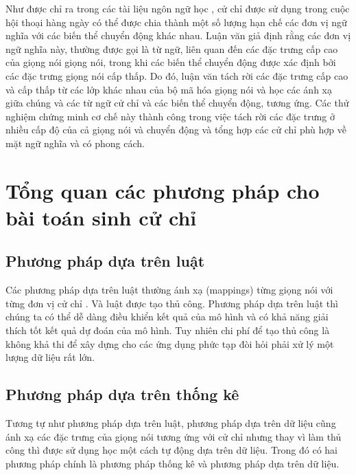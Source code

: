 Như được chỉ ra trong các tài liệu ngôn ngữ học \cite{kipp2005gesture} \cite{neff2008gesture} \cite{webb1997linguistic},
cử chỉ được sử dụng trong cuộc hội thoại hàng ngày có thể được chia thành một số lượng hạn chế các đơn vị ngữ nghĩa với các biến thể chuyển động khác nhau. Luận văn giả định rằng các đơn vị ngữ nghĩa này, thường được gọi là từ ngữ, liên quan đến các đặc trưng cấp cao của giọng nói giọng nói, trong khi các biến thể chuyển động được xác định bởi các đặc trưng giọng nói cấp thấp. Do đó, luận văn tách rời các đặc trưng cấp cao và cấp thấp từ các lớp khác nhau của bộ mã hóa giọng nói và học các ánh xạ giữa chúng và các từ ngữ cử chỉ và các biến thể chuyển động, tương ứng. Các thử nghiệm chứng minh cơ chế này thành công trong việc tách rời các đặc trưng ở nhiều cấp độ của cả giọng nói và chuyển động và tổng hợp các cử chỉ phù hợp về mặt ngữ nghĩa và có phong cách.

\section{Tổng quan các phương pháp cho bài toán sinh cử chỉ}
\label{sec:relatedwork}

\subsection{Phương pháp dựa trên luật}

Các phương pháp dựa trên luật thường ánh xạ (mappings) từng giọng nói với từng đơn vị cử chỉ \cite{huang2012robot}. Và luật được tạo thủ công. Phương pháp dựa trên luật thì chúng ta có thể dễ dàng điều khiển kết quả của mô hình và có khả năng giải thích tốt kết quả dự đoán của mô hình.
Tuy nhiên chi phí để tạo thủ công là không khả thi để xây dựng cho các ứng dụng phức tạp đòi hỏi phải xử lý một lượng dữ liệu rất lớn.

\subsection{Phương pháp dựa trên thống kê}

Tương tự như phương pháp dựa trên luật, phương pháp dựa trên dữ liệu cũng ánh xạ các đặc trưng của giọng nói tương ứng với cử chỉ nhưng thay vì làm thủ công thì được sử dụng học một cách tự động dựa trên dữ liệu.
Trong đó có hai phương pháp chính là phương pháp thống kê và phương pháp dựa trên dữ liệu.


